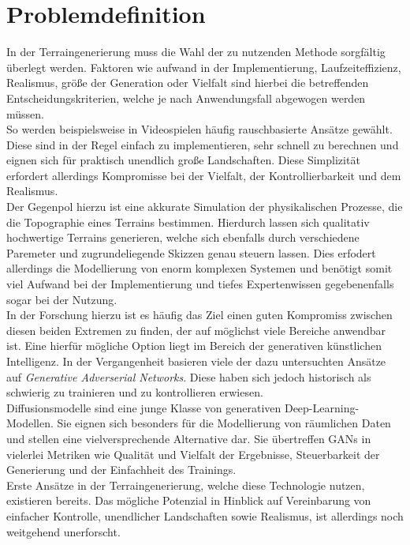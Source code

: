 \section{Problemdefinition}

In der Terraingenerierung muss die Wahl der zu nutzenden Methode sorgfältig überlegt werden. Faktoren wie aufwand in der Implementierung, Laufzeiteffizienz, Realismus, größe der Generation oder Vielfalt sind hierbei die betreffenden Entscheidungskriterien, welche je nach Anwendungsfall abgewogen werden müssen. \\
So werden beispielsweise in Videospielen häufig rauschbasierte Ansätze gewählt. Diese sind in der Regel einfach zu implementieren, sehr schnell zu berechnen und eignen sich für praktisch unendlich große Landschaften. Diese Simplizität erfordert allerdings Kompromisse bei der Vielfalt, der Kontrollierbarkeit und dem Realismus. \\
Der Gegenpol hierzu ist eine akkurate Simulation der physikalischen Prozesse, die die Topographie eines Terrains bestimmen. Hierdurch lassen sich qualitativ hochwertige Terrains generieren, welche sich ebenfalls durch verschiedene Paremeter und zugrundeliegende Skizzen genau steuern lassen. Dies erfodert allerdings die Modellierung von enorm komplexen Systemen und benötigt somit viel Aufwand bei der Implementierung und tiefes Expertenwissen gegebenenfalls sogar bei der Nutzung. \\
In der Forschung hierzu ist es häufig das Ziel einen guten Kompromiss zwischen diesen beiden Extremen zu finden, der auf möglichst viele Bereiche anwendbar ist. Eine hierfür mögliche Option liegt im Bereich der generativen künstlichen Intelligenz. In der Vergangenheit basieren viele der dazu untersuchten Ansätze auf \textit{Generative Adverserial Networks}. Diese haben sich jedoch historisch als schwierig zu trainieren und zu kontrollieren erwiesen. \\
Diffusionsmodelle sind eine junge Klasse von generativen Deep-Learning-Modellen. Sie eignen sich besonders für die Modellierung von räumlichen Daten und stellen eine vielversprechende Alternative dar. Sie übertreffen GANs in vielerlei Metriken wie Qualität und Vielfalt der Ergebnisse, Steuerbarkeit der Generierung und der Einfachheit des Trainings. \\
Erste Ansätze in der Terraingenerierung, welche diese Technologie nutzen, existieren bereits. Das mögliche Potenzial in Hinblick auf Vereinbarung von einfacher Kontrolle, unendlicher Landschaften sowie Realismus, ist allerdings noch weitgehend unerforscht.



